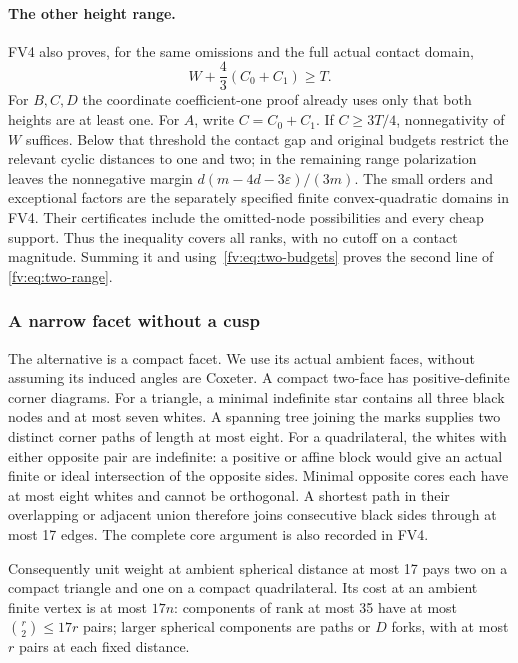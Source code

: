 \documentclass[11pt]{article}
\theoremstyle{remark}\newtheorem{remark}[theorem]{Remark}
\numberwithin{equation}{section}
\begin{document}
\paragraph{The other height range.}
FV4 also proves, for the same omissions and the full actual
contact domain,
\[
 W+\frac43(C_0+C_1)\ge T.
\]
For $B,C,D$ the coordinate coefficient-one proof already uses
only that both heights are at least one. For $A$, write
$C=C_0+C_1$. If $C\ge3T/4$, nonnegativity of $W$ suffices.
Below that threshold the contact gap and original budgets
restrict the relevant cyclic distances to one and two; in the
remaining range polarization leaves the nonnegative margin
$d(m-4d-3\varepsilon)/(3m)$. The small orders and exceptional
factors are the separately specified finite convex-quadratic
domains in FV4. Their certificates include the omitted-node
possibilities and every cheap support. Thus the inequality covers
all ranks, with no cutoff on a contact magnitude. Summing it and
using~\eqref{fv:eq:two-budgets} proves the second line of
\eqref{fv:eq:two-range}.

\subsubsection{A narrow facet without a cusp}

The alternative is a compact facet. We use its actual ambient
faces, without assuming its induced angles are Coxeter. A compact
two-face has positive-definite corner diagrams. For a triangle,
a minimal indefinite star contains all three black nodes and at
most seven whites. A spanning tree joining the marks supplies
two distinct corner paths of length at most eight. For a
quadrilateral, the whites with either opposite pair are indefinite:
a positive or affine block would give an actual finite or ideal
intersection of the opposite sides. Minimal opposite cores each
have at most eight whites and cannot be orthogonal. A shortest
path in their overlapping or adjacent union therefore joins
consecutive black sides through at most 17 edges. The complete
core argument is also recorded in FV4.

Consequently unit weight at ambient spherical distance at most
17 pays two on a compact triangle and one on a compact
quadrilateral. Its cost at an ambient finite vertex is at most
$17n$: components of rank at most 35 have at most
$\binom r2\le17r$ pairs; larger spherical components are paths
or $D$ forks, with at most $r$ pairs at each fixed distance.
\end{document}

